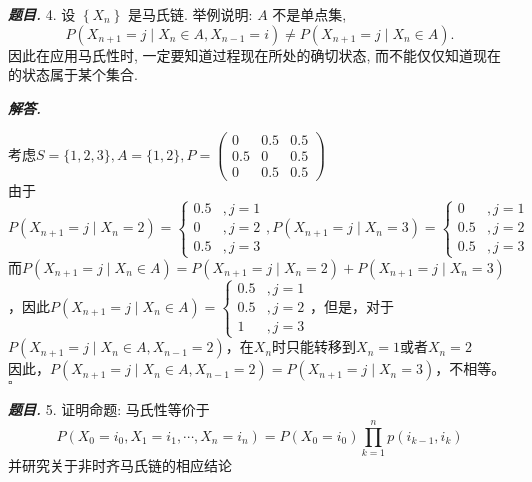 \documentclass[10pt, a4paper, oneside]{ctexart}
\newenvironment{problem}{\begin{framed}\par\noindent\textbf{\textit{题目. }}}{\end{framed}\par}
\newenvironment{solution}{%
  \par\noindent\textbf{\textit{解答. }}\ignorespaces
}{%
  \hfill\ensuremath{\square}\par %
}
\begin{document}
\begin{problem}
4. 设 $\left\{X_n\right\}$ 是马氏链. 举例说明: $A$ 不是单点集,
$$
P\left(X_{n+1}=j \mid X_n \in A, X_{n-1}=i\right) \neq P\left(X_{n+1}=j \mid X_n \in A\right) .
$$
因此在应用马氏性时, 一定要知道过程现在所处的确切状态, 而不能仅仅知道现在的状态属于某个集合.  
\end{problem}
\begin{solution}
考虑$S=\{1,2,3\},A=\{1,2\},P=\left( \begin{matrix} 0 & {0.5} & {0.5} \\  {0.5} & 0 & {0.5} \\  0 & {0.5} & {0.5} \end{matrix}\right)$\\由于$P\left(X_{n+1}=j \mid X_n=2\right)=\begin{cases}
    0.5&,j=1\\
    0&,j=2\\
    0.5&,j=3
\end{cases},P\left(X_{n+1}=j \mid X_n=3\right)=\begin{cases}
    0&,j=1\\
    0.5&,j=2\\
    0.5&,j=3
\end{cases}$\\而$P\left(X_{n+1}=j \mid X_n\in A\right)=P\left(X_{n+1}=j \mid X_n=2\right)+P\left(X_{n+1}=j \mid X_n=3\right)$，因此$P\left(X_{n+1}=j \mid X_n\in A\right)=\begin{cases}
    0.5&,j=1\\
    0.5&,j=2\\
    1&,j=3
\end{cases}$，但是，对于$P\left(X_{n+1}=j \mid X_n\in A,X_{n-1}=2\right)$，在$X_n$时只能转移到$X_n=1$或者$X_n=2$\\因此，$P\left(X_{n+1}=j \mid X_n\in A,X_{n-1}=2\right)=P\left(X_{n+1}=j \mid X_n=3\right)$，不相等。
\end{solution}
\begin{problem}
    5. 证明命题: 马氏性等价于
    $$P\left( {{X}_{0} = {i}_{0},{X}_{1} = {i}_{1},\cdots ,{X}_{n} = {i}_{n}}\right)  = P\left( {{X}_{0} = {i}_{0}}\right) \mathop{\prod }\limits_{{k = 1}}^{n}p\left( {{i}_{k - 1},{i}_{k}}\right) $$
    并研究关于非时齐马氏链的相应结论
\end{problem}
\end{document}
